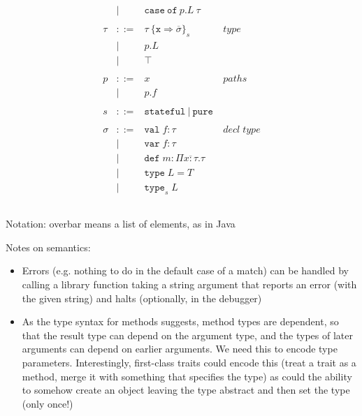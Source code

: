 \documentclass{article}
\newcommand{\keywadj}[1]{\mathtt{#1}}
\newcommand{\keyw}[1]{\keywadj{#1}~}
\begin{document}
\[\begin{array}{lll}
\begin{array}{lllr}
& | & \keyw{case} \keyw{of} p.L~\tau &\\
&&\\
\tau & ::= & \tau~\{\texttt{x} \Rightarrow \overline{\sigma}\}_{s} & type \\
& | & p.L &\\
& | & \top &\\
&&\\
p & ::= & x & paths \\
& | & p.f &\\
&&\\
s & ::= & \keyw{stateful} | ~\keyw{pure} \\
&&\\
\sigma & ::= & \texttt{val} \; f:\tau & decl \; type\\
       & |   & \texttt{var} \; f:\tau \\
       & |   & \texttt{def} \; m:\Pi \overline{x{:}\tau} . \tau \\
       & |   & \texttt{type} \; L = T &\\
       & |   & \texttt{type}_{s} \; L &\\
&&\\
\end{array}
\end{array}
\]

Notation: overbar means a list of elements, as in Java

Notes on semantics:

\begin{itemize}


\item Errors (e.g. nothing to do in the default case of a match) can be handled by calling a library function taking a string argument that reports an error (with the given string) and halts (optionally, in the debugger)


\item As the type syntax for methods suggests, method types are dependent, so that the result type can depend on the argument type, and the types of later arguments can depend on earlier arguments.  We need this to encode type parameters.  Interestingly, first-class traits could encode this (treat a trait as a method, merge it with something that specifies the type) as could the ability to somehow create an object leaving the type abstract and then set the type (only once!)

\end{itemize}
\end{document}

